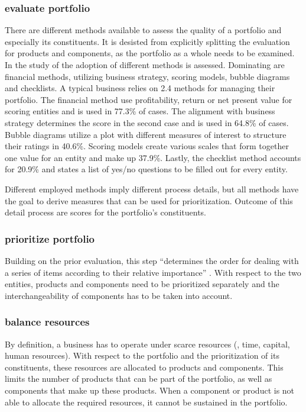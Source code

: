 		\subsubsection{evaluate portfolio}
		There are different methods available to assess the quality of a portfolio and especially its constituents. It is desisted from explicitly splitting the evaluation for products and components, as the portfolio as a whole needs to be examined. In the study of \cite{cooper1999new} the adoption of different methods is assessed. Dominating are financial methods, utilizing business strategy, scoring models, bubble diagrams and checklists. A typical business relies on 2.4 methods for managing their portfolio. The financial method use profitability, return or net present value for scoring entities and is used in 77.3\% of cases. The alignment with business strategy determines the score in the second case and is used in 64.8\% of cases. Bubble diagrams utilize a plot with different measures of interest to structure their ratings in 40.6\%. Scoring models create various scales that form together one value for an entity and make up 37.9\%. Lastly, the checklist method accounts for 20.9\% and states a list of yes/no questions to be filled out for every entity.  
		
		Different employed methods imply different process details, but all methods have the goal to derive measures that can be used for prioritization. Outcome of this detail process are scores for the portfolio's constituents. 
		
		\subsubsection{prioritize portfolio}
		Building on the prior evaluation, this step \enquote{determines the order for dealing with a series of items according to their relative importance} \citep{oxfordprioritize}. With respect to the two entities, products and components need to be prioritized separately and the interchangeability of components has to be taken into account. 		
		\subsubsection{balance resources}
		By definition, a business has to operate under scarce resources (\eg, time, capital, human resources). With respect to the portfolio and the prioritization of its constituents, these resources are allocated to products and components. This limits the number of products that can be part of the portfolio, as well as components that make up these products. When a component or product is not able to allocate the required resources, it cannot be sustained in the portfolio.
		
